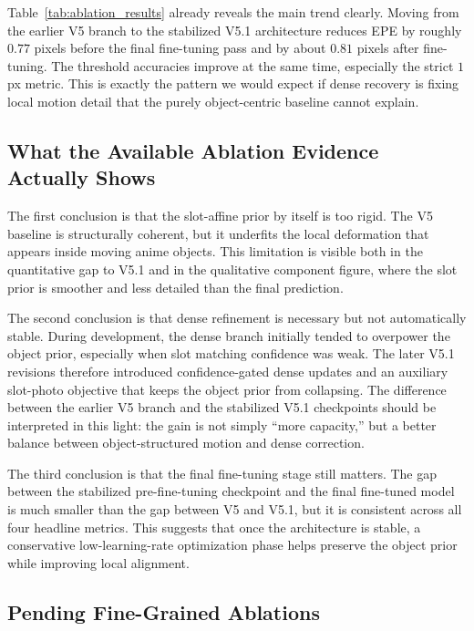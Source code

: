 Table~\ref{tab:ablation_results} already reveals the main trend clearly. Moving from the earlier V5 branch to the stabilized V5.1 architecture reduces EPE by roughly $0.77$ pixels before the final fine-tuning pass and by about $0.81$ pixels after fine-tuning. The threshold accuracies improve at the same time, especially the strict $1$px metric. This is exactly the pattern we would expect if dense recovery is fixing local motion detail that the purely object-centric baseline cannot explain.

\subsection{What the Available Ablation Evidence Actually Shows}

The first conclusion is that the slot-affine prior by itself is too rigid. The V5 baseline is structurally coherent, but it underfits the local deformation that appears inside moving anime objects. This limitation is visible both in the quantitative gap to V5.1 and in the qualitative component figure, where the slot prior is smoother and less detailed than the final prediction.

The second conclusion is that dense refinement is necessary but not automatically stable. During development, the dense branch initially tended to overpower the object prior, especially when slot matching confidence was weak. The later V5.1 revisions therefore introduced confidence-gated dense updates and an auxiliary slot-photo objective that keeps the object prior from collapsing. The difference between the earlier V5 branch and the stabilized V5.1 checkpoints should be interpreted in this light: the gain is not simply ``more capacity,'' but a better balance between object-structured motion and dense correction.

The third conclusion is that the final fine-tuning stage still matters. The gap between the stabilized pre-fine-tuning checkpoint and the final fine-tuned model is much smaller than the gap between V5 and V5.1, but it is consistent across all four headline metrics. This suggests that once the architecture is stable, a conservative low-learning-rate optimization phase helps preserve the object prior while improving local alignment.

\subsection{Pending Fine-Grained Ablations}

